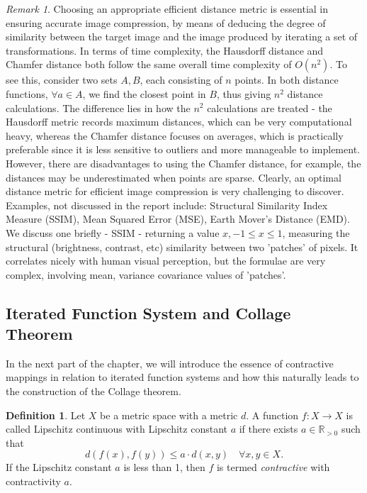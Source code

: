 \documentclass[a4paper,11pt, titlepage]{article}
\theoremstyle{definition}
\newtheorem{definition}{Definition}[section]
\theoremstyle{plain}
\theoremstyle{remark}
\newtheorem*{remark}{Remark}
\theoremstyle{definition}
\begin{document}
\begin{remark}
Choosing an appropriate efficient distance metric is essential in ensuring accurate image compression, by means of deducing the degree of similarity between the target image and the image produced by iterating a set of transformations. In terms of time complexity, the Hausdorff distance and Chamfer distance both follow the same overall time complexity of $O(n^2)$. To see this, consider two sets $A, B$, each consisting of $n$ points. In both distance functions, $\forall a \in A$, we find the closest point in $B$, thus giving $n^2$ distance calculations. The difference lies in how the $n^2$ calculations are treated - the Hausdorff metric records maximum distances, which can be very computational heavy, whereas the Chamfer distance focuses on averages, which is practically preferable since it is less sensitive to outliers and more manageable to implement. However, there are disadvantages to using the Chamfer distance, for example, the distances may be underestimated when points are sparse. Clearly, an optimal distance metric for efficient image compression is very challenging to discover. Examples, not discussed in the report include: Structural Similarity Index Measure (SSIM), Mean Squared Error (MSE), Earth Mover's Distance (EMD). We discuss one briefly - SSIM - returning a value $x, -1 \leq x \leq 1$, measuring the structural (brightness, contrast, etc) similarity between two 'patches' of pixels. It correlates nicely with human visual perception, but the formulae are very complex, involving mean, variance covariance values of 'patches'.
\end{remark}

\subsection{Iterated Function System and Collage Theorem}

In the next part of the chapter, we will introduce the essence of contractive mappings in relation to iterated function systems and how this naturally leads to the construction of the Collage theorem.

\begin{definition}
Let \( X \) be a metric space with a metric \( d \). A function \( f : X \to X \) is called Lipschitz continuous with Lipschitz constant \( a \) if there exists \( a \in \mathbb{R}_{>0} \) such that
\[
d(f(x), f(y)) \leq a \cdot d(x, y) \quad \forall x, y \in X.
\]
If the Lipschitz constant \( a \) is less than 1, then \( f \) is termed \textit{contractive} with contractivity \( a \).
\end{definition}
\end{document}
